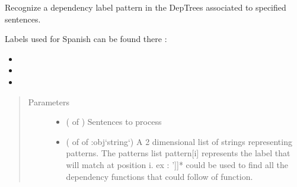 \documentclass[letterpaper,10pt,english]{sphinxmanual}
\begin{document}
\begin{fulllineitems}
\begin{quote}
\begin{description}
\end{description}\end{quote}

\end{fulllineitems}


\begin{fulllineitems}
\label{\detokenize{analysis:loacore.analysis.pattern_recognition.label_patterns_recognition}}
Recognize a dependency label pattern in the DepTrees associated to specified sentences.

Labels used for Spanish can be found there :
\begin{itemize}
\item {} 

\item {} 

\item {} 

\end{itemize}
\begin{quote}\begin{description}
\item[{Parameters}] \leavevmode\begin{itemize}
\item {} 
 ( of ) \textendash{} Sentences to process

\item {} 
 ( of  of :obj{}`string{}`) \textendash{} A 2 dimensional list of strings representing patterns. The patterns list pattern{[}i{]} represents the label that
will match at position i. ex : \sphinxstyleemphasis{pattern = {[}{[}‘sentence’, ‘v’{]}, {[}‘}’{]}{]}* could be used to find all the dependency
functions that could follow  of  function.

\end{itemize}


\end{description}
\end{quote}
\end{fulllineitems}
\end{document}
